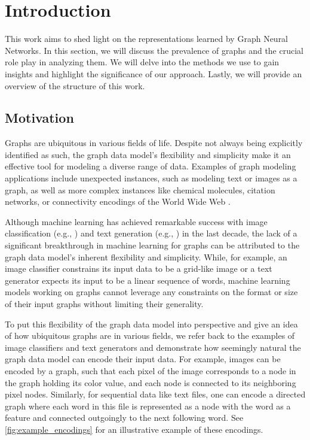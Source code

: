 \section{Introduction}
This work aims to shed light on the representations learned by \textsf{Graph Neural Networks}. In this section, we will discuss the prevalence of graphs and the crucial role \gnns play in analyzing them. We will delve into the methods we use to gain insights and highlight the significance of our approach. Lastly, we will provide an overview of the structure of this work.

\subsection{Motivation}
Graphs are ubiquitous in various fields of life. Despite not always being explicitly identified as such, the graph data model's flexibility and simplicity make it an effective tool for modeling a diverse range of data. Examples of graph modeling applications include unexpected instances, such as modeling text or images as a graph, as well as more complex instances like chemical molecules, citation networks, or connectivity encodings of the World Wide Web \cite{Mor+2020, Sca+2009}.

Although machine learning has achieved remarkable success with image classification (e.g., \cite{Zoph2018, He2016}) and text generation (e.g., \cite{Radford2019, Brown2020}) in the last decade, the lack of a significant breakthrough in machine learning for graphs can be attributed to the graph data model's inherent flexibility and simplicity. While, for example, an image classifier constrains its input data to be a grid-like image or a text generator expects its input to be a linear sequence of words, machine learning models working on graphs cannot leverage any constraints on the format or size of their input graphs without limiting their generality. 

To put this flexibility of the graph data model into perspective and give an idea of how ubiquitous graphs are in various fields, we refer back to the examples of image classifiers and text generators and demonstrate how seemingly natural the graph data model can encode their input data. For example, images can be encoded by a graph, such that each pixel of the image corresponds to a node in the graph holding its color value, and each node is connected to its neighboring pixel nodes. Similarly, for sequential data like text files, one can encode a directed graph where each word in this file is represented as a node with the word as a feature and connected outgoingly to the next following word. See \cref{fig:example_encodings} for an illustrative example of these encodings.

